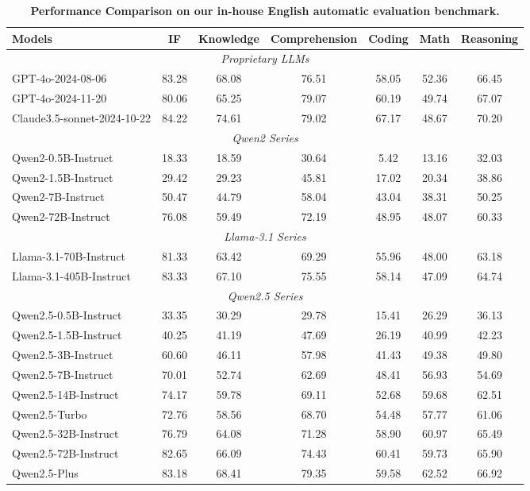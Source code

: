 \documentclass{article}
\begin{document}
\begin{table}[tbp]
\centering
\small
\caption{\textbf{Performance Comparison on our in-house English automatic evaluation benchmark.} }
\label{tab:eval_v11_EN}
\begin{tabular}{@{}lcccccc@{}}
\toprule
\textbf{Models} & \textbf{IF} & \textbf{Knowledge} & \textbf{Comprehension} & \textbf{Coding} & \textbf{Math} & \textbf{Reasoning} \\
\midrule
\multicolumn{7}{c}{\textit{Proprietary LLMs}} \\
\midrule
GPT-4o-2024-08-06 & 83.28 & 68.08 & 76.51 & 58.05 & 52.36 & 66.45 \\
GPT-4o-2024-11-20 & 80.06 & 65.25 & 79.07 & 60.19 & 49.74 & 67.07 \\
Claude3.5-sonnet-2024-10-22 & 84.22 & 74.61 & 79.02 & 67.17 & 48.67 & 70.20\\
\midrule
\multicolumn{7}{c}{\textit{Qwen2 Series}} \\
\midrule
Qwen2-0.5B-Instruct & 18.33 & 18.59 & 30.64 & 5.42 & 13.16 & 32.03 \\
Qwen2-1.5B-Instruct & 29.42 & 29.23 & 45.81 & 17.02 & 20.34 & 38.86 \\
Qwen2-7B-Instruct & 50.47 & 44.79 & 58.04 & 43.04 & 38.31 & 50.25 \\
Qwen2-72B-Instruct & 76.08 & 59.49 & 72.19 & 48.95 & 48.07 & 60.33 \\
\midrule
\multicolumn{7}{c}{\textit{Llama-3.1 Series}} \\
\midrule
Llama-3.1-70B-Instruct & 81.33 & 63.42 & 69.29 & 55.96 & 48.00 & 63.18 \\
Llama-3.1-405B-Instruct & 83.33 & 67.10 & 75.55 & 58.14 & 47.09 & 64.74\\
\midrule
\multicolumn{7}{c}{\textit{Qwen2.5 Series}} \\
\midrule
Qwen2.5-0.5B-Instruct & 33.35 & 30.29 & 29.78 & 15.41 & 26.29 & 36.13 \\
Qwen2.5-1.5B-Instruct & 40.25 & 41.19 & 47.69 & 26.19 & 40.99 & 42.23 \\
Qwen2.5-3B-Instruct & 60.60 & 46.11 & 57.98 & 41.43 & 49.38 & 49.80 \\
Qwen2.5-7B-Instruct & 70.01 & 52.74 & 62.69 & 48.41 & 56.93 & 54.69 \\
Qwen2.5-14B-Instruct & 74.17 & 59.78 & 69.11 & 52.68 & 59.68 & 62.51 \\
Qwen2.5-Turbo        & 72.76 & 58.56 & 68.70 & 54.48 & 57.77 & 61.06 \\
Qwen2.5-32B-Instruct & 76.79 & 64.08 & 71.28 & 58.90 & 60.97 & 65.49 \\
Qwen2.5-72B-Instruct & 82.65 & 66.09 & 74.43 & 60.41 & 59.73 & 65.90 \\
Qwen2.5-Plus         & 83.18 & 68.41 & 79.35 & 59.58 & 62.52 & 66.92 \\
\bottomrule
\end{tabular}
\end{table}
\end{document}
